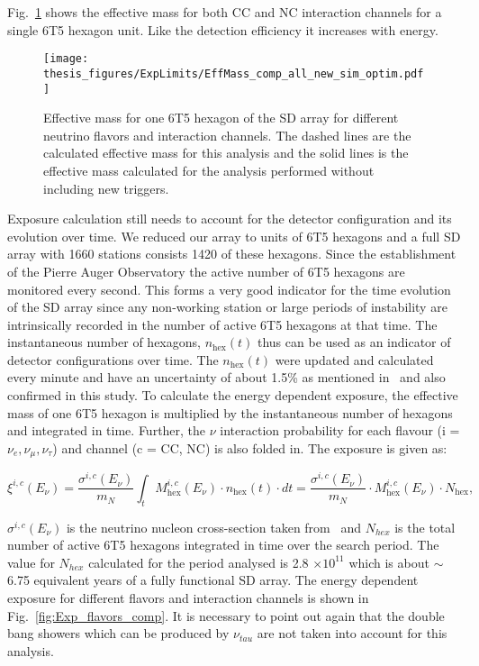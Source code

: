 Fig.~\ref{fig:EffMass_flavors_comp} shows the effective mass for both CC and NC interaction channels for a single 6T5 hexagon unit. Like the detection efficiency it increases with energy. 

\begin{figure}[t!]
  \centering
  \texttt{[image: thesis\_figures/ExpLimits/EffMass\_comp\_all\_new\_sim\_optim.pdf]}
  \caption{Effective mass for one 6T5 hexagon of the SD array for different neutrino flavors and interaction channels. The dashed lines are the calculated effective mass for this analysis and the solid lines is the effective mass calculated for the analysis performed without including new triggers.}
  \label{fig:EffMass_flavors_comp}
\end{figure}
Exposure calculation still needs to account for the detector configuration and its evolution over time. We reduced our array to units of 6T5 hexagons and a full SD array with 1660 stations consists 1420 of these hexagons. Since the establishment of the Pierre Auger Observatory the active number of 6T5 hexagons are monitored every second. This forms a very good indicator for the time evolution of the SD array since any non-working station or large periods of instability are intrinsically recorded in the number of active 6T5 hexagons at that time. The instantaneous number of hexagons, $n_{\text{hex}}(t)$ thus can be used as an indicator of detector configurations over time. The $n_{\text{hex}}(t)$ were updated and calculated every minute and have an uncertainty of about 1.5\% as mentioned in~\cite{PierreAuger:2010zof} and also confirmed in this study. To calculate the energy dependent exposure, the effective mass of one 6T5 hexagon is multiplied by the instantaneous number of hexagons and integrated in time. Further, the $\nu$ interaction probability for each flavour (i = $\nu_e, \nu_{\mu}, \nu_{\tau}$) and channel (c = CC, NC) is also folded in. The exposure is given as:

\begin{equation}
  \xi^{i,c}(E_{\nu}) = \frac{\sigma^{i,c}(E_{\nu})}{m_N} \int_{t} M_{\text{hex}}^{i,c}(E_{\nu}) \cdot n_{\text{hex}}(t) \cdot dt =  \frac{\sigma^{i,c}(E_{\nu})}{m_N} \cdot M_{\text{hex}}^{i,c}(E_{\nu}) \cdot N_{\text{hex}},
\end{equation}

$\sigma^{i,c}(E_{\nu})$ is the neutrino nucleon cross-section taken from~\cite{Cooper-Sarkar:2011jtt} and $N_{hex}$ is the total number of active 6T5 hexagons integrated in time over the search period. The value for $N_{hex}$ calculated for the period analysed is 2.8 $\times 10^{11}$ which is about $\sim$6.75 equivalent years of a fully functional SD array. The energy dependent exposure for different flavors and interaction channels is shown in Fig.~\ref{fig:Exp_flavors_comp}. It is necessary to point out again that the double bang showers which can be produced by $\nu_{tau}$ are not taken into account for this analysis.

